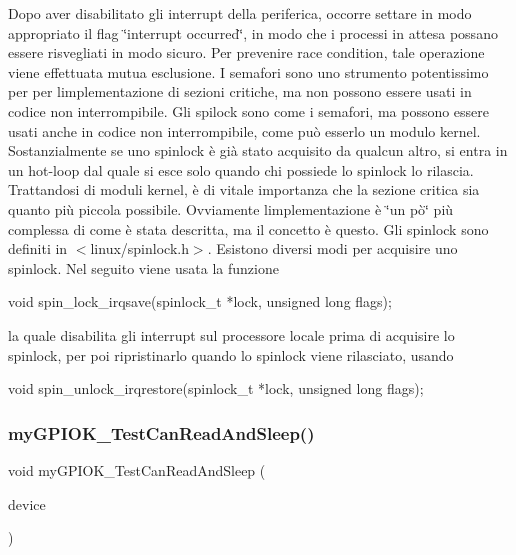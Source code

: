 Dopo aver disabilitato gli interrupt della periferica, occorre settare in modo appropriato il flag \char`\"{}interrupt occurred\char`\"{}, in modo che i processi in attesa possano essere risvegliati in modo sicuro. Per prevenire race condition, tale operazione viene effettuata mutua esclusione. I semafori sono uno strumento potentissimo per per l\textquotesingle{}implementazione di sezioni critiche, ma non possono essere usati in codice non interrompibile. Gli spilock sono come i semafori, ma possono essere usati anche in codice non interrompibile, come può esserlo un modulo kernel. Sostanzialmente se uno spinlock è già stato acquisito da qualcun altro, si entra in un hot-\/loop dal quale si esce solo quando chi possiede lo spinlock lo rilascia. Trattandosi di moduli kernel, è di vitale importanza che la sezione critica sia quanto più piccola possibile. Ovviamente l\textquotesingle{}implementazione è \char`\"{}un pò\char`\"{} più complessa di come è stata descritta, ma il concetto è questo. Gli spinlock sono definiti in $<$linux/spinlock.\+h$>$. Esistono diversi modi per acquisire uno spinlock. Nel seguito viene usata la funzione 
\begin{DoxyCode}
\textcolor{keywordtype}{void} spin\_lock\_irqsave(spinlock\_t *lock, \textcolor{keywordtype}{unsigned} \textcolor{keywordtype}{long} flags);
\end{DoxyCode}
 la quale disabilita gli interrupt sul processore locale prima di acquisire lo spinlock, per poi ripristinarlo quando lo spinlock viene rilasciato, usando 
\begin{DoxyCode}
\textcolor{keywordtype}{void} spin\_unlock\_irqrestore(spinlock\_t *lock, \textcolor{keywordtype}{unsigned} \textcolor{keywordtype}{long} flags);
\end{DoxyCode}
 \mbox{\label{group__my_g_p_i_o_k__t_gaf1b6f35c097c46361d675a42f122828e}} 
\subsubsection{\texorpdfstring{my\+G\+P\+I\+O\+K\+\_\+\+Test\+Can\+Read\+And\+Sleep()}{myGPIOK\_TestCanReadAndSleep()}}
{\footnotesize\ttfamily void my\+G\+P\+I\+O\+K\+\_\+\+Test\+Can\+Read\+And\+Sleep (\begin{DoxyParamCaption}\item[{\hyperlink{structmy_g_p_i_o_k__t}{my\+G\+P\+I\+O\+K\+\_\+t} $\ast$}]{device }\end{DoxyParamCaption})}



